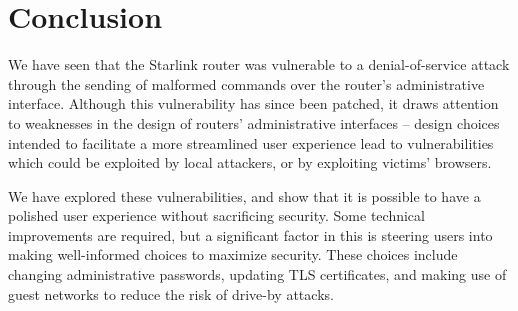 \section{Conclusion}\label{sec:conclusion}

We have seen that the Starlink router was vulnerable to a denial-of-service attack through the sending of malformed commands over the router's administrative interface.
Although this vulnerability has since been patched, it draws attention to weaknesses in the design of routers' administrative interfaces -- design choices intended to facilitate a more streamlined user experience lead to vulnerabilities which could be exploited by local attackers, or by exploiting victims' browsers.

We have explored these vulnerabilities, and show that it is possible to have a polished user experience without sacrificing security.
Some technical improvements are required, but a significant factor in this is steering users into making well-informed choices to maximize security.
These choices include changing administrative passwords, updating TLS certificates, and making use of guest networks to reduce the risk of drive-by attacks.
